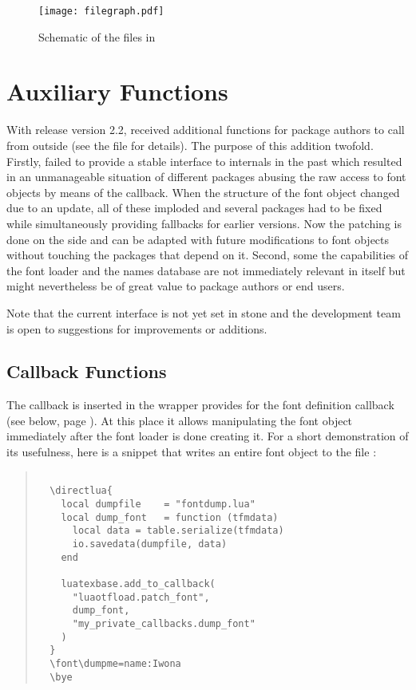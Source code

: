 \begin{figure}[b]
  \caption{Schematic of the files in }
  \texttt{[image: filegraph.pdf]}
  \label{file-graph}
\end{figure}

\section{Auxiliary Functions}

With release version 2.2,  received
additional functions for package authors to call from outside
(see the file  for details).
%
The purpose of this addition twofold.
%
Firstly,  failed to provide a stable interface
to internals in the past which resulted in an unmanageable situation
of different packages abusing the raw access to font objects by means
of the  callback.
%
When the structure of the font object changed due to an update, all
of these imploded and several packages had to be fixed while
simultaneously providing fallbacks for earlier versions.
%
Now the patching is done on the  side and can
be adapted with future modifications to font objects without touching
the packages that depend on it.
%
Second, some the capabilities of the font loader and the names
database are not immediately relevant in 
itself but might nevertheless be of great value to package authors or
end users.

Note that the current interface is not yet set in stone and the
development team is open to suggestions for improvements or
additions.

\subsection{Callback Functions}

The  callback is inserted in the wrapper
 provides for the font definition callback
(see below, page \pageref{define-font}).
%
At this place it allows manipulating the font object immediately after
the font loader is done creating it.
%
For a short demonstration of its usefulness, here is a snippet that
writes an entire font object to the file :

\begin{quote}
  \begin{verbatim}
  
  \directlua{
    local dumpfile    = "fontdump.lua"
    local dump_font   = function (tfmdata)
      local data = table.serialize(tfmdata)
      io.savedata(dumpfile, data)
    end

    luatexbase.add_to_callback(
      "luaotfload.patch_font",
      dump_font,
      "my_private_callbacks.dump_font"
    )
  }
  \font\dumpme=name:Iwona
  \bye
  \end{verbatim}
\end{quote}

